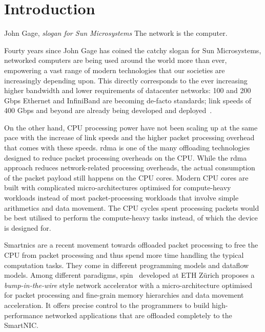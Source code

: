\chapter{Introduction}
\begin{chapquote}{John Gage, \textit{slogan for Sun Microsystems}}
The network is the computer.
\end{chapquote}

Fourty years since John Gage has coined the catchy slogan for Sun Microsystems, networked computers are being used around the world more than ever, empowering a vast range of modern technologies that our societies are increasingly depending upon.  This directly corresponds to the ever increasing higher bandwidth and lower requirements  of datacenter networks: 100 and 200 Gbps Ethernet and InfiniBand are becoming de-facto standards; link speeds of 400 Gbps and beyond are already being developed and deployed~\cite{miller_pursuit_nodate}.

On the other hand, CPU processing power have not been scaling up at the same pace with the increase of link speeds and the higher packet processing overhead that comes with these speeds.  \ac{rdma} is one of the many offloading technologies designed to reduce packet processing overheads on the CPU.  While the \ac{rdma} approach reduces network-related processing overheads, the actual consumption of the packet payload still happens on the CPU cores.  Modern CPU cores are built with complicated micro-architectures optimised for compute-heavy workloads instead of most packet-processing workloads that involve simple arithmetics and data movement.  The CPU cycles spent processing packets would be best utilised to perform the compute-heavy tasks instead,  of which the device is designed for. 

Smart\acs{nic}s are a recent movement towards offloaded packet processing to free the CPU from packet processing and thus spend more time handling the typical computation tasks.  They come in different programming models and dataflow models.  Among different paradigms, \ac{spin}~\cite{hoefler_spin_2017} developed at ETH Z\"urich proposes a \emph{bump-in-the-wire}  style network accelerator with a micro-architecture optimised for packet processing and fine-grain memory hierarchies and data movement acceleration.  It offers precise control to the programmers to build high-performance networked applications that are offloaded completely to the SmartNIC.

